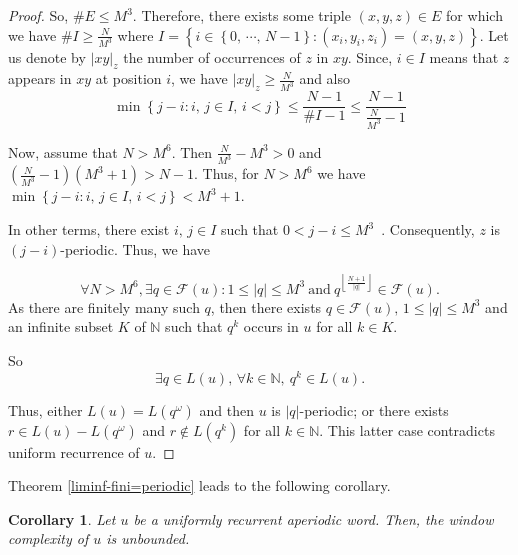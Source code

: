 \documentclass[a4 paper,12pt]{article}
\newtheorem{corollary}{Corollary}[section]
\begin{document}
\begin{proof}
So, $\# E \leq M^3$. Therefore, there exists some triple $(x, y, z)\in E$  for which we have $\# I\geq \frac{N}{M^{3}}$ where $I=\left\lbrace i\in \left\lbrace 0,\, \cdots,\, N-1\right\rbrace : \left( x_i,y_i,z_i\right) =\left( x,y,z\right)  \right\rbrace $. Let us denote by  $|xy|_z$ the number of occurrences of $z$ in $xy$. Since,  $i\in I$  means that $z$ appears in $xy$ at position $i$, we have $|xy|_z\geq \frac{N}{M^3}$ and also
$$\min\left\{j-i: i,\, j\in I, \, i<j\right\}\leq \frac{N-1}{\#I-1}\leq \frac{N-1}{\frac{N}{M^3}-1}$$ 

Now, assume that $N>M^6$. Then $\frac{N}{M^3}-M^3>0$ and  $(\frac{N}{M^3}-1)(M^3+1)>N-1$. Thus, for $N>M^6$ we have $\min\left\{j-i: i,\, j\in I, \, i<j\right\}<M^3+1$.

In other terms,  there exist $i,\,j\in I$ such that $0<j-i\leq M^3$~. Consequently, $z$ is $(j-i)$-periodic. Thus, we have

%
%
$$\forall N>M^6,\exists q\in \mathcal{F}(u): 1\leq |q|\leq M^3\ \textrm{and}\  q^{\left\lfloor \frac{N+1}{\left|q\right|}\right\rfloor}\in \mathcal{F}(u).$$
As there are finitely many such $q$, then there exists $q\in \mathcal{F}(u),\, 1\leq |q|\leq M^3$ and an  infinite subset $K$ of $\mathbb{N}$ such that $q^k$ occurs in $u$ for all $k\in K$.
 
So
$$ \exists q\in L(u),\,   \forall k\in \mathbb{N},\ q^k \in L(u).$$


Thus, either $L(u)=L(q^\omega) $ and then $u$ is $|q|$-periodic; or there exists  $r\in L(u)-L(q^\omega)$ and $r\notin L(q^k)$ for all $k\in \mathbb{N}$. 
This latter  case contradicts uniform recurrence of $u$.  \end{proof}


Theorem \ref{liminf-fini=periodic} leads to the following corollary.

\begin{corollary}
Let $u$ be a uniformly recurrent aperiodic word. Then, the window complexity of $u$ is unbounded.
\end{corollary}
\end{document}
